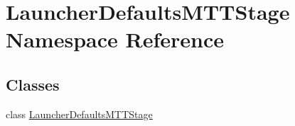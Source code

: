 \hypertarget{namespace_launcher_defaults_m_t_t_stage}{\section{Launcher\-Defaults\-M\-T\-T\-Stage Namespace Reference}
\label{namespace_launcher_defaults_m_t_t_stage}
}
\subsection*{Classes}
\begin{DoxyCompactItemize}
\item 
class \hyperlink{class_launcher_defaults_m_t_t_stage_1_1_launcher_defaults_m_t_t_stage}{Launcher\-Defaults\-M\-T\-T\-Stage}
\end{DoxyCompactItemize}
